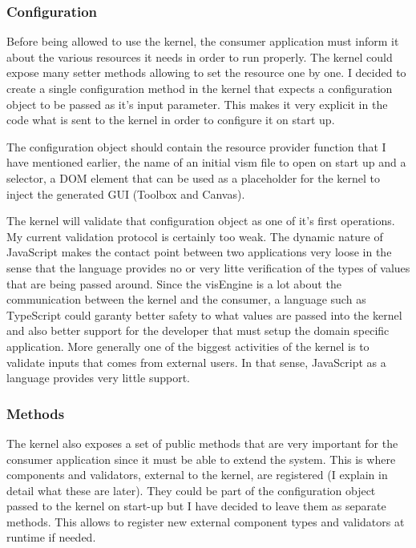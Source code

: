 \subsubsection{Configuration}

Before being allowed to use the kernel, the consumer application must inform it about the various resources it needs in order to run properly. The kernel could expose many setter methods allowing to set the resource one by one. I decided to create a single configuration method in the kernel that expects a configuration object to be passed as it's input parameter. This makes it very explicit in the code what is sent to the kernel in order to configure it on start up.

The configuration object should contain the resource provider function that I have mentioned earlier, the name of an initial vism file to open on start up and a selector, a DOM element that can be used as a placeholder for the kernel to inject the generated GUI (Toolbox and Canvas).

The kernel will validate that configuration object as one of it's first operations. My current validation protocol is certainly too weak. The dynamic nature of JavaScript makes the contact point between two applications very loose in the sense that the language provides no or very litte verification of the types of values that are being passed around. Since the visEngine is a lot about the communication between the kernel and the consumer, a language such as TypeScript could garanty better safety to what values are passed into the kernel and also better support for the developer that must setup the domain specific application. More generally one of the biggest activities of the kernel is to validate inputs that comes from external users. In that sense, JavaScript as a language provides very little support.

\subsubsection{Methods}

The kernel also exposes a set of public methods that are very important for the consumer application since it must be able to extend the system. This is where components and validators, external to the kernel, are registered (I explain in detail what these are later). They could be part of the configuration object passed to the kernel on start-up but I have decided to leave them as separate methods. This allows to register new external component types and validators at runtime if needed.

